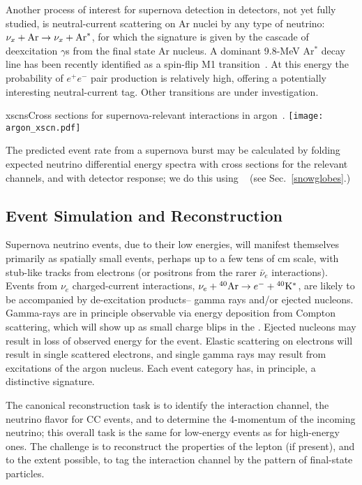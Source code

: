 Another process of interest for supernova detection in  detectors,
not yet fully studied,  is neutral-current  scattering on Ar nuclei by
any type of neutrino: $\nu_x + {\rm Ar} \rightarrow \nu_x + {\rm
  Ar}^*$,  for which the signature is given by the cascade of
deexcitation $\gamma$s from the final state Ar nucleus.  A dominant
9.8-MeV Ar$^*$ decay line has been recently identified as a spin-flip
M1 transition~\cite{Hayes}.   At this energy the probability of
$e^+e^-$ pair production is relatively high, offering a potentially
interesting neutral-current tag.  Other transitions are under investigation.


\begin{dunefigure}{xscns}{Cross sections for supernova-relevant interactions in argon~\cite{GilBotella:2003sz,snowglobes}.}
\texttt{[image: argon\_xscn.pdf]}
\end{dunefigure}

The predicted event rate from a supernova burst may be calculated by
folding expected neutrino differential energy spectra with cross
sections for the relevant channels, and with detector response; we do
this using ~\cite{snowglobes} (see Sec.~\ref{snowglobes}.)


\subsection{Event Simulation and Reconstruction}

Supernova neutrino events, due to their low energies, will manifest
themselves primarily as spatially small events, perhaps up to a few tens of cm
scale, with stub-like tracks from
electrons (or positrons from the rarer $\bar{\nu}_e$ interactions).
Events from $\nu_e $ charged-current interactions, $\nu_e+{}^{40}{\rm
  Ar}\rightarrow e^{-}+{}^{40}{\rm K}^{*}$, are likely to be
accompanied by de-excitation products-- gamma rays and/or ejected
nucleons. Gamma-rays are in principle observable via energy deposition
from Compton scattering, which will show up as small charge blips in
the .  
Ejected nucleons may result in loss of observed energy for
the event.  Elastic scattering on electrons will result in single
scattered electrons, and single gamma rays may result from  
excitations of the argon nucleus.   Each event category has, in principle, a
distinctive signature.

The canonical reconstruction task is to identify the interaction
channel, the neutrino flavor for CC events, and to determine the
4-momentum of the incoming neutrino; this overall task is the same for
low-energy events as for high-energy ones.  The challenge is to
reconstruct the properties of the lepton (if present), and to the extent
possible, to tag the interaction channel by the pattern of final-state
particles.

